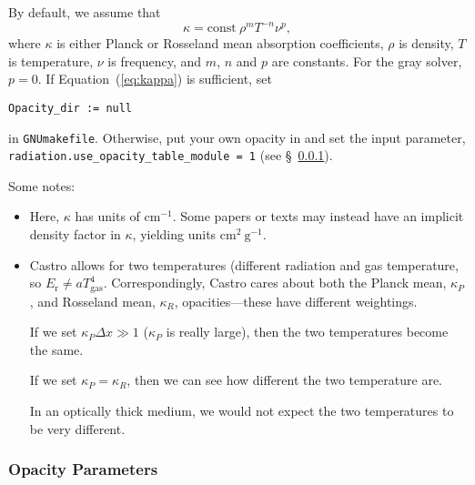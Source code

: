 \documentclass[11pt,letterpaper]{article}
\begin{document}
By default, we assume that
\begin{equation}
  \kappa = \mathrm{const}\ \rho^{m} T^{-n} \nu^{p} , \label{eq:kappa}
\end{equation}
where $\kappa$ is either Planck or Rosseland mean absorption
coefficients, $\rho$ is density, $T$ is temperature, $\nu$ is
frequency, and $m$, $n$ and $p$ are constants.  For the gray solver,
$p = 0$.  If Equation~(\ref{eq:kappa}) is sufficient, set
\begin{verbatim}
Opacity_dir := null
\end{verbatim}
in {\tt GNUmakefile}.  Otherwise, put your own opacity in
{\tt{}} and set
the input parameter, {\tt radiation.use\_opacity\_table\_module = 1} (see
\S~\ref{sec:opacpars}).

Some notes:
\begin{itemize}
\item Here, $\kappa$ has units of $\mathrm{cm}^{-1}$.  Some papers or
  texts may instead have an implicit density factor in $\kappa$,
  yielding units $\mathrm{cm}^2~\mathrm{g}^{-1}$.

\item Castro allows for two temperatures (different radiation and gas
  temperature, so $E_\mathrm{r} \ne a T_\mathrm{gas}^4$.
  Correspondingly, Castro cares about both the Planck mean,
  $\kappa_P$, and Rosseland mean, $\kappa_R$, opacities---these have
  different weightings.

  If we set $\kappa_P \Delta x \gg 1$ ($\kappa_P$ is really large),
  then the two temperatures become the same.

  If we set $\kappa_P = \kappa_R$, then we can see how different the
  two temperature are.

  In an optically thick medium, we would not expect the two temperatures
  to be very different.

\end{itemize}


\subsubsection{Opacity Parameters}
\label{sec:opacpars}
\end{document}
